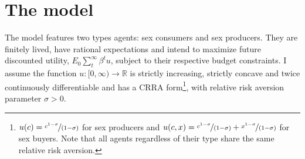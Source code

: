 \section{\sf The model}\label{sec4}
The model features two types agents: sex consumers and sex producers. They are finitely lived, have rational expectations and intend to maximize future discounted utility, $E_{0}\sum_{t}^{\infty}\beta^{t}u$, subject to their respective budget constraints. I assume the function $u:[0,\infty)\to \mathbb{R}$ is strictly increasing, strictly concave and twice continuously differentiable and has a CRRA form\footnote{$u(c)=\nicefrac{c^{1-\sigma}}{(1-\sigma)}$ for sex producers and $u(c,x)=\nicefrac{c^{1-\sigma}}{(1-\sigma)}+\nicefrac{x^{1-\sigma}}{(1-\sigma)}$ for sex buyers.  Note that all agents regardless of their type share the same relative risk aversion. }, with relative risk aversion parameter $\sigma>0$.

